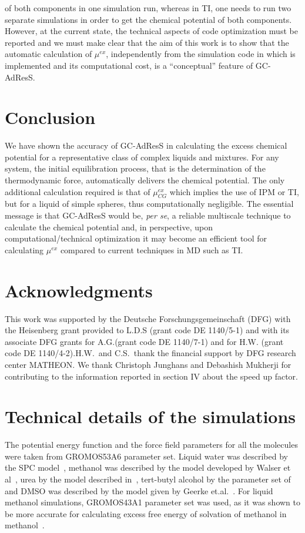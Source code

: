 \documentclass[a4paper,preprint,unsortedaddress]{revtex4-1}
\newcommand{\recheck}[1]{{\color{red} #1}}
\begin{document}
of both components in one simulation run, whereas in TI, one needs to run two separate simulations in order to get the chemical potential of both components.
However, at the current state, the technical aspects of code optimization must be reported and we must make clear that the aim of this work is to show that  the automatic calculation of $\mu^{ex}$, independently from the simulation code in which is implemented and its computational cost, is a ``conceptual'' feature of GC-AdResS.
  
\section{Conclusion} 
We have shown the accuracy of GC-AdResS in calculating the excess chemical potential for a representative class of complex liquids and mixtures. 
For any system, the initial equilibration process, that is the determination of the thermodynamic force, automatically delivers the chemical potential. The only additional calculation required is that of $\mu^{ex}_{CG}$ which implies the use of IPM or TI, but for a liquid of simple spheres, thus computationally negligible.  
The essential message is that GC-AdResS would be, {\it per se}, a reliable multiscale technique to calculate the chemical potential and, in perspective, upon computational/technical optimization it may become an efficient tool for calculating $\mu^{ex}$ compared to current techniques in MD such as TI. 

\section*{Acknowledgments}
This work was supported by the Deutsche Forschungsgemeinschaft (DFG) with the Heisenberg grant provided to L.D.S (grant code DE 1140/5-1) and with its associate DFG grants for A.G.(grant code DE 1140/7-1) and for H.W. (grant code DE 1140/4-2).H.W.~and C.S.~thank the financial support by DFG research center MATHEON. \recheck{We thank Christoph Junghans and Debashish Mukherji for contributing to the information reported in section IV about the speed up factor}.

\appendix
\section{Technical details of the simulations}
The potential energy function and the force field parameters for all the molecules
were taken from GROMOS53A6 parameter set. Liquid water was described by the SPC
model~\cite{spc}, methanol was described by the model developed by Walser et al~\cite{walser},
urea by the model described in~\cite{urea}, tert-butyl alcohol by the parameter set of~\cite{tba}
and DMSO was described by the model given by Geerke et.al.~\cite{dmso1}. For liquid methanol simulations, 
GROMOS43A1 parameter set was used, as it was shown to be more accurate for calculating excess free energy of 
solvation of methanol in methanol~\cite{vang}. 
\end{document}
